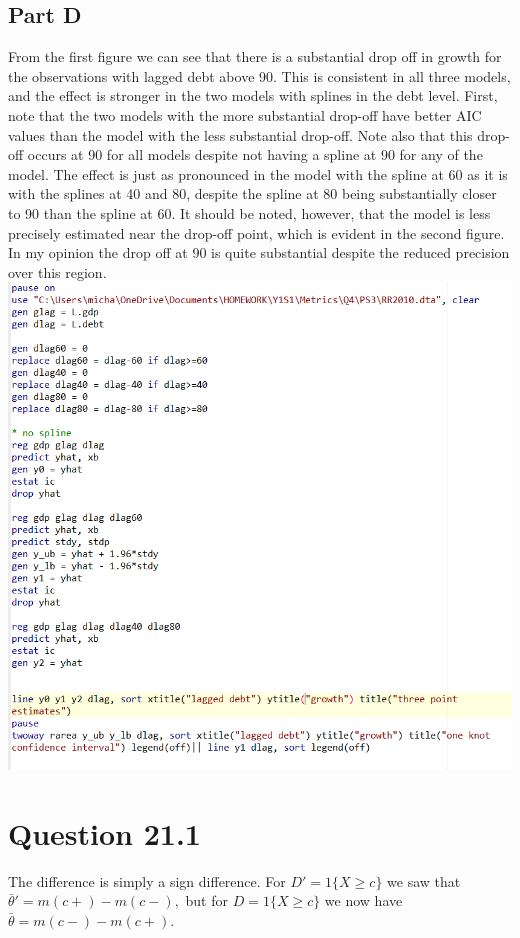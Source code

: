\documentclass[11pt]{article} %
\begin{document}
\subsection{Part D}
From the first figure we can see that there is a substantial drop off in growth for the observations with lagged debt above 90. This is consistent in all three models, and the effect is stronger in the two models with splines in the debt level. First, note that the two models with the more substantial drop-off have better AIC values than the model with the less substantial drop-off. Note also that this drop-off occurs at 90 for all models despite not having a spline at 90 for any of the model. The effect is just as pronounced in the model with the spline at 60 as it is with the splines at 40 and 80, despite the spline at 80 being substantially closer to 90 than the spline at 60. It should be noted, however, that the model is less precisely estimated near the drop-off point, which is evident in the second figure. In my opinion the drop off at 90 is quite substantial despite the reduced precision over this region.\\
\includegraphics[scale=0.7]{p6}
\section{Question 21.1}
The difference is simply a sign difference. For $D'=1\{X\geq c \}$ we saw that $\bar{\theta}' = m(c+) - m(c-),$ but for $D = 1\{ X\geq c \}$ we now have $\bar{\theta} = m(c-) - m(c+)$.
\end{document}
